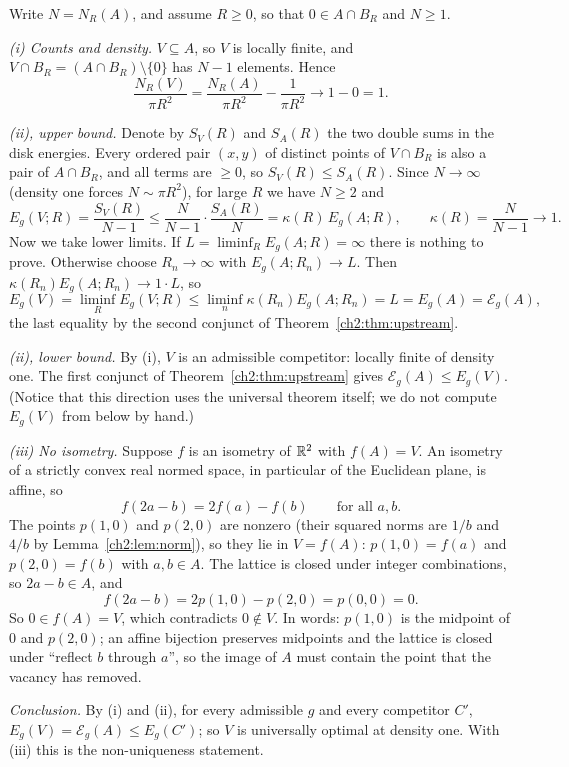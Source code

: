 \begin{humanproof}
Write $N=N_R(A)$, and assume $R\ge0$, so that $0\in A\cap B_R$ and $N\ge1$.

\emph{(i) Counts and density.} $V\subseteq A$, so $V$ is locally finite, and $V\cap B_R=(A\cap B_R)\setminus\{0\}$ has
$N-1$ elements. Hence
\[
\frac{N_R(V)}{\pi R^2}=\frac{N_R(A)}{\pi R^2}-\frac1{\pi R^2}\longrightarrow1-0=1.
\]

\emph{(ii), upper bound.} Denote by $S_V(R)$ and $S_A(R)$ the two double sums in the disk energies. Every ordered pair
$(x,y)$ of distinct points of $V\cap B_R$ is also a pair of $A\cap B_R$, and all terms are $\ge0$, so $S_V(R)\le
S_A(R)$. Since $N\to\infty$ (density one forces $N\sim\pi R^2$), for large $R$ we have $N\ge2$ and
\[
E_g(V;R)=\frac{S_V(R)}{N-1}\le\frac{N}{N-1}\cdot\frac{S_A(R)}{N}=\kappa(R)\,E_g(A;R),\qquad
\kappa(R)=\frac{N}{N-1}\longrightarrow1.
\]
Now we take lower limits. If $L=\liminf_R E_g(A;R)=\infty$ there is nothing to prove. Otherwise choose $R_n\to\infty$
with $E_g(A;R_n)\to L$. Then $\kappa(R_n)E_g(A;R_n)\to1\cdot L$, so
\[
E_g(V)=\liminf_RE_g(V;R)\le\liminf_n\kappa(R_n)E_g(A;R_n)=L=E_g(A)=\mathcal{E}_g(A),
\]
the last equality by the second conjunct of Theorem~\ref{ch2:thm:upstream}.

\emph{(ii), lower bound.} By (i), $V$ is an admissible competitor: locally finite of density one. The first conjunct of
Theorem~\ref{ch2:thm:upstream} gives $\mathcal{E}_g(A)\le E_g(V)$. (Notice that this direction uses the universal
theorem itself; we do not compute $E_g(V)$ from below by hand.)

\emph{(iii) No isometry.} Suppose $f$ is an isometry of $\mathbb{R}^2$ with $f(A)=V$. An isometry of a strictly convex real
normed space, in particular of the Euclidean plane, is affine, so
\[
f(2a-b)=2f(a)-f(b)\qquad\text{for all }a,b.
\]
The points $p(1,0)$ and $p(2,0)$ are nonzero (their squared norms are $1/b$ and $4/b$ by Lemma~\ref{ch2:lem:norm}), so
they lie in $V=f(A)$: $p(1,0)=f(a)$ and $p(2,0)=f(b)$ with $a,b\in A$. The lattice is closed under integer combinations,
so $2a-b\in A$, and
\[
f(2a-b)=2p(1,0)-p(2,0)=p(0,0)=0.
\]
So $0\in f(A)=V$, which contradicts $0\notin V$. In words: $p(1,0)$ is the midpoint of $0$ and $p(2,0)$; an affine
bijection preserves midpoints and the lattice is closed under ``reflect $b$ through $a$'', so the image of $A$ must
contain the point that the vacancy has removed.

\emph{Conclusion.} By (i) and (ii), for every admissible $g$ and every competitor $C'$,
$E_g(V)=\mathcal{E}_g(A)\le E_g(C')$; so $V$ is universally optimal at density one. With (iii) this is the
non-uniqueness statement.
\end{humanproof}

